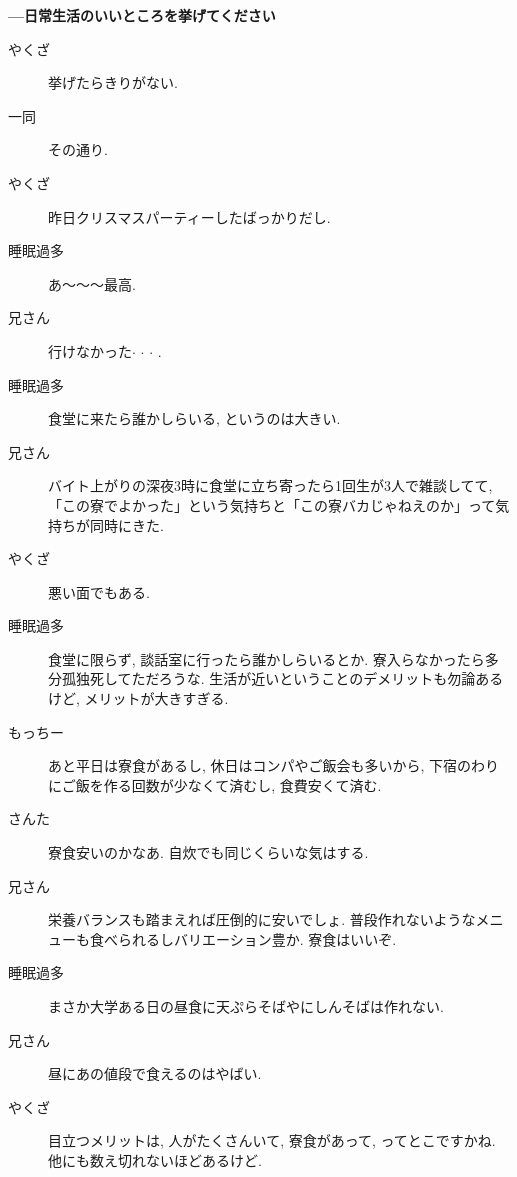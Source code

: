 \documentclass[10pt,b5jsbook,dvips,dvipdfmx,openany]{jsbook}
\theoremstyle{definition}
\begin{document}
		\textbf{---日常生活のいいところを挙げてください}
		\begin{description}
		\item[やくざ]挙げたらきりがない.
		\item[ 一同 ]その通り.
		\item[やくざ]昨日クリスマスパーティーしたばっかりだし.
		\item[睡眠過多]あ〜〜〜最高.
		\item[兄さん]行けなかった$ \cdot $ $ \cdot $ $ \cdot $ .
		\item[睡眠過多]食堂に来たら誰かしらいる, というのは大きい.
		\item[兄さん]バイト上がりの深夜3時に食堂に立ち寄ったら1回生が3人で雑談してて, 「この寮でよかった」という気持ちと「この寮バカじゃねえのか」って気持ちが同時にきた.
		\item[やくざ]悪い面でもある.
		\item[睡眠過多]食堂に限らず, 談話室に行ったら誰かしらいるとか. 寮入らなかったら多分孤独死してただろうな. 生活が近いということのデメリットも勿論あるけど, メリットが大きすぎる.
		\item[もっちー]あと平日は寮食があるし, 休日はコンパやご飯会も多いから, 下宿のわりにご飯を作る回数が少なくて済むし, 食費安くて済む.
		\item[さんた]寮食安いのかなあ. 自炊でも同じくらいな気はする.
		\item[兄さん]栄養バランスも踏まえれば圧倒的に安いでしょ. 普段作れないようなメニューも食べられるしバリエーション豊か. 寮食はいいぞ.
		\item[睡眠過多]まさか大学ある日の昼食に天ぷらそばやにしんそばは作れない.
		\item[兄さん]昼にあの値段で食えるのはやばい.
		\item[やくざ]目立つメリットは, 人がたくさんいて, 寮食があって, ってとこですかね. 他にも数え切れないほどあるけど.
		\end{description}
\end{document}
